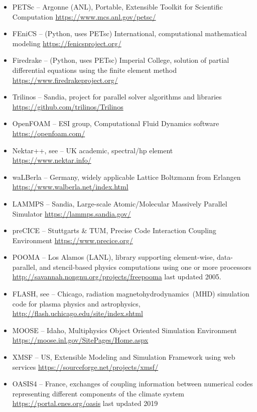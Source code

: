 \begin{itemize}
\item PETSc  -- Argonne (ANL), Portable, Extensible Toolkit for Scientific Computation \url{https://www.mcs.anl.gov/petsc/}
\item FEniCS  -- (Python, uses PETsc) International, computational mathematical modeling \url{https://fenicsproject.org/}
\item Firedrake  -- (Python, uses PETsc) Imperial College, solution of partial differential equations using the finite element method \url{https://www.firedrakeproject.org/}
\item Trilinos  -- Sandia, project for parallel solver algorithms and libraries \url{https://github.com/trilinos/Trilinos}
\item OpenFOAM  -- ESI group, Computational Fluid Dynamics software \url{https://openfoam.com/}
\item Nektar++, see   -- UK academic, spectral/hp element \url{https://www.nektar.info/}
\item waLBerla  -- Germany, widely applicable Lattice Boltzmann from Erlangen \url{https://www.walberla.net/index.html}
\item LAMMPS  -- Sandia, Large-scale Atomic/Molecular Massively Parallel Simulator \url{https://lammps.sandia.gov/}
\item preCICE  -- Stuttgarts \& TUM, Precise Code Interaction Coupling Environment \url{https://www.precice.org/}
\item POOMA  -- Los Alamos (LANL), library supporting element-wise, data-parallel, and stencil-based physics computations using one or more processors  \url{http://savannah.nongnu.org/projects/freepooma} last updated 2005.
\item FLASH, see   -- Chicago, radiation magnetohydrodynamics~(MHD) simulation code for plasma physics and astrophysics, \url{http://flash.uchicago.edu/site/index.shtml}
\item MOOSE  -- Idaho, Multiphysics Object Oriented Simulation Environment \url{https://moose.inl.gov/SitePages/Home.aspx}
\item XMSF  -- US, Extensible Modeling and Simulation Framework using web services \url{https://sourceforge.net/projects/xmsf/}
\item OASIS4 -- France, exchanges of coupling information between numerical codes representing different components of the climate system \url{https://portal.enes.org/oasis} last updated 2019 
\end{itemize}
